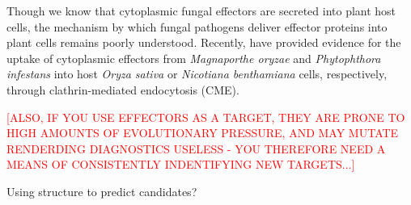 Though we know that cytoplasmic fungal effectors are secreted into plant host cells, the mechanism by which fungal pathogens deliver effector proteins into plant cells remains poorly understood. Recently, \textcite{Oliveira-Garcia2023, Wang2023} have provided evidence for the uptake of cytoplasmic effectors from \textit{Magnaporthe oryzae} and \textit{Phytophthora infestans} into host \textit{Oryza sativa} or \textit{Nicotiana benthamiana} cells, respectively, through clathrin-mediated endocytosis (CME).  

\textcolor{red}{[ALSO, IF YOU USE EFFECTORS AS A TARGET, THEY ARE PRONE TO HIGH AMOUNTS OF EVOLUTIONARY PRESSURE, AND MAY MUTATE RENDERDING DIAGNOSTICS USELESS - YOU THEREFORE NEED A MEANS OF CONSISTENTLY INDENTIFYING NEW TARGETS...]}

Using structure to predict candidates?